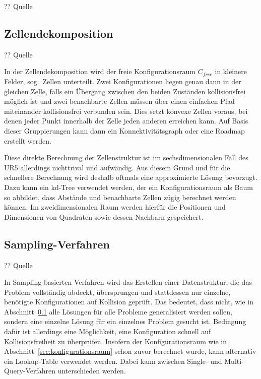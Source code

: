 ?? Quelle

\subsection{Zellendekomposition}\label{subsec:zellendekomposition}
?? Quelle

In der Zellendekomposition wird der freie Konfigurationsraum $C_{free}$ in kleinere Felder, sog.\ Zellen unterteilt.
Zwei Konfigurationen liegen genau dann in der gleichen Zelle, falls ein Übergang zwischen den beiden Zuständen kollisionsfrei möglich ist und zwei benachbarte Zellen müssen über einen einfachen Pfad miteinander kollisionsfrei verbunden sein.
Dies setzt konvexe Zellen voraus, bei denen jeder Punkt innerhalb der Zelle jeden anderen erreichen kann.
Auf Basis dieser Gruppierungen kann dann ein Konnektivitätsgraph oder eine Roadmap erstellt werden.

Diese direkte Berechnung der Zellenstruktur ist im sechsdimensionalen Fall des UR5 allerdings nichttrival und aufwändig.
Aus diesem Grund und für die schnellere Berechnung wird deshalb oftmals eine approximierte Lösung bevorzugt.
Dazu kann ein kd-Tree verwendet werden, der ein Konfigurationsraum als Baum so abbildet, dass Abstände und benachbarte Zellen zügig berechnet werden können.
Im zweidimensionalen Raum werden hierfür die Positionen und Dimensionen von Quadraten sowie dessen Nachbarn gespeichert.

\subsection{Sampling-Verfahren}
?? Quelle

In Sampling-basierten Verfahren wird das Erstellen einer Datenstruktur, die das Problem vollständig abdeckt, übersprungen und stattdessen nur einzelne, benötigte Konfigurationen auf Kollision geprüft.
Das bedeutet, dass nicht, wie in Abschnitt~\ref{subsec:zellendekomposition} alle Lösungen für alle Probleme generalisiert werden sollen, sondern eine einzelne Lösung für ein einzelnes Problem gesucht ist.
Bedingung dafür ist allerdings eine Möglichkeit, eine Konfiguration schnell auf Kollisionsfreiheit zu überprüfen.
Insofern der Konfigurationsraum wie in Abschnitt~\ref{sec:konfigurationsraum} schon zuvor berechnet wurde, kann alternativ ein Lookup-Table verwendet werden.
Dabei kann zwischen Single- und Multi-Query-Verfahren unterschieden werden.

